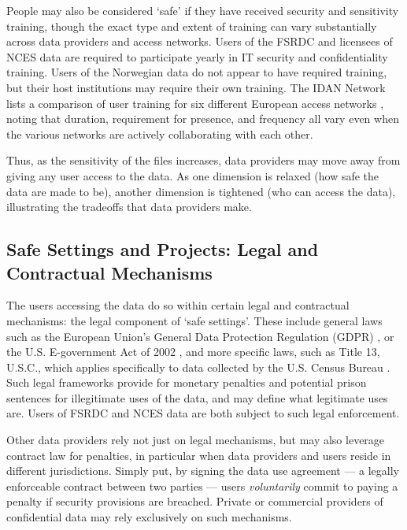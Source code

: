 People may also be considered `safe' if they have received security and sensitivity training, though the exact type and extent of training can vary substantially across data providers and access networks. Users of the FSRDC and licensees of NCES data are required to participate yearly in IT security and confidentiality training. Users of the Norwegian data do not appear to have required training, but their host institutions may require their own training. The IDAN Network lists a comparison of user training for six different European access networks \cite{idan_network_idan_nodate}, noting that duration, requirement for presence, and frequency all vary even when the various networks are actively collaborating with each other. 

Thus, as the sensitivity of the files increases, data providers may move away from giving any user access to the data. As one dimension is relaxed (how safe the data are made to be), another dimension is tightened (who can access the data), illustrating the tradeoffs that data providers make. 

\subsection{Safe Settings and Projects: Legal and Contractual Mechanisms}

The users accessing the data do so within certain legal and contractual mechanisms: the legal component of `safe settings'. These include general laws such as the European Union's General Data Protection Regulation (GDPR) \cite{noauthor_general_2016}, or the U.S. E-government Act of 2002 \cite{noauthor_e-government_2002}, and more specific laws, such as Title 13, U.S.C., which applies specifically to data collected by the U.S. Census Bureau \cite{noauthor_title_nodate,us_census_bureau_federal_2021}. Such legal frameworks provide for monetary penalties and potential prison sentences for illegitimate uses of the data, and may define what legitimate uses are. Users of FSRDC and NCES data are both subject to such legal enforcement.

Other data providers rely not just on legal mechanisms, but may also leverage contract law for penalties, in particular when data providers and users reside in different jurisdictions. Simply put, by signing the data use agreement --- a legally enforceable contract between two parties --- users \textit{voluntarily}  commit to paying a penalty if security provisions are breached. Private or commercial providers of confidential data may rely exclusively on such mechanisms. 

